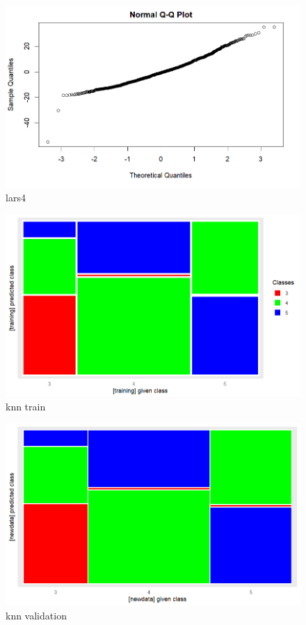 \documentclass{article}
\begin{document}
\begin{figure}[h!]
        \centering
        \includegraphics[width=1.1\textwidth]{../plots/lars4.png}
        \caption{lars4}
        \label{fig:lars4}
\end{figure}

\begin{figure}[h!]
        \centering
        \includegraphics[width=1.1\textwidth]{../plots/mos_knn_train.png}
        \caption{knn train}
        \label{fig:knntrain}
\end{figure}

\begin{figure}[h!]
        \centering
        \includegraphics[width=1.1\textwidth]{../plots/mos_knn_val.png}
        \caption{knn validation}
        \label{fig:knnval}
\end{figure}
\end{document}
